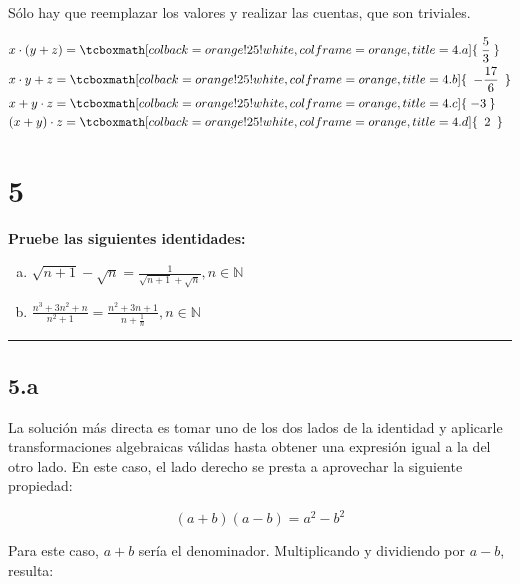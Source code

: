 \documentclass{article}
\newcommand{\hresulte}[3]{\tcboxmath[colback=orange!25!white,colframe=orange, title=#1] { \hspace{#3} #2 \hspace{#3} } }
\begin{document}
\vspace{1em}

Sólo hay que reemplazar los valores y realizar las cuentas, que son triviales.

\begin{subequations}
\begin{align}
& x \cdot (y + z) = \hresulte{4.a} { \frac{5}{3} }{0.25em} \\
& x \cdot y + z = \hresulte{4.b} { -\frac{17}{6} }{0.5em} \\
& x + y \cdot z = \hresulte{4.c} { -3 }{0.25em} \\
& (x + y) \cdot z = \hresulte{4.d} { 2 }{0.5em}
\end{align}
\end{subequations}

\section*{5}
\label{sec:5}

\textbf{Pruebe las siguientes identidades:}

\begin{enumerate}[(a)]
\bfseries

\item $ \sqrt{n+1} - \sqrt{n} = \frac{1}{\sqrt{n+1} + \sqrt{n}}, n \in \mathbb{N} $

\item $ \frac{n^3 + 3n^2 + n}{n^2 + 1} = \frac{n^2 + 3n + 1}{n + \frac{1}{n}}, n \in \mathbb{N}$

\end{enumerate}
\hrule

\subsection*{5.a}
\label{subsec:5.a}

La solución más directa es tomar uno de los dos lados de la identidad y aplicarle transformaciones algebraicas válidas hasta obtener una expresión igual a la del otro lado. En este caso, el lado derecho se presta a aprovechar la siguiente propiedad:

\begin{equation}
(a + b)(a - b) = a^2 - b^2
\end{equation}

Para este caso, $a + b$ sería el denominador. Multiplicando y dividiendo por $a - b$, resulta:
\end{document}
